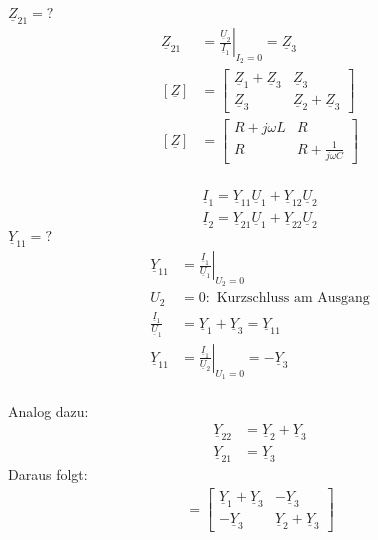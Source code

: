 $\underline{Z}_{21}=?$\\
\begin{align}
	\underline{Z}_{21}&=\left.\frac{\underline{U}_2}{\underline{I}_1}\right|_{I_2=0}=\underline{Z}_3\nonumber\\
	[\underline{Z}]&=
	\begin{bmatrix}
		\underline{Z}_1+\underline{Z}_3 & \underline{Z}_3\\
		\underline{Z}_3 & \underline{Z}_2+\underline{Z}_3
	\end{bmatrix}\nonumber\\
	[\underline{Z}]&=
	\begin{bmatrix}
		R+j\omega L & R\\
		R & R+\frac{1}{j\omega C}
	\end{bmatrix}\nonumber
\end{align}
\\
\begin{align}
	\underline{I}_1=\underline{Y}_11\underline{U}_1+\underline{Y}_12\underline{U}_2\nonumber\\
	\underline{I}_2=\underline{Y}_21\underline{U}_1+\underline{Y}_22\underline{U}_2\nonumber
\end{align}
$\underline{Y}_{11}=?$\\
\begin{align}	
	\underline{Y}_{11}&=\left.\frac{\underline{I}_1}{\underline{U}_1}\right|_{U_2=0}\nonumber\\
	U_2&=0: \text{ Kurzschluss am Ausgang}\nonumber\\
	\frac{\underline{I}_1}{\underline{U}_1}&=\underline{Y}_1+\underline{Y}_3=\underline{Y}_{11}\nonumber\\
	\underline{Y}_{11}&=\left.\frac{\underline{I}_1}{\underline{U}_2}\right|_{U_1=0}=-\underline{Y}_3\nonumber
\end{align}
\\
Analog dazu:\\
\begin{align}
	\underline{Y}_{22}&=\underline{Y}_2+\underline{Y}_3\nonumber\\
	\underline{Y}_{21}&=\underline{Y}_3\nonumber
\end{align}
Daraus folgt:
\begin{align}
	[\underline{Y}]=
	\begin{bmatrix}
		\underline{Y}_1+\underline{Y}_3 & -\underline{Y}_3\\
		-\underline{Y}_3 & \underline{Y}_2+\underline{Y}_3
	\end{bmatrix}\nonumber
\end{align}
